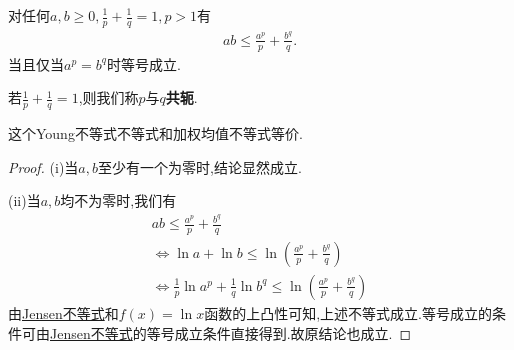 \documentclass[../../main.tex]{subfiles}%
\begin{document}
\begin{theorem}[Young不等式]\label{theorem:Young不等式}
对任何$a,b\geqslant 0,\frac{1}{p}+\frac{1}{q}=1,p>1$有
\begin{align*}
ab\leqslant \frac{a^p}{p}+\frac{b^q}{q}.
\end{align*}
当且仅当$a^p=b^q$时等号成立.
\end{theorem}
\begin{note}
若$\frac{1}{p}+\frac{1}{q}=1$,则我们称$p$与$q$\textbf{共轭}.\label{实数之间的共轭}
\end{note}
\begin{remark}
这个Young不等式不等式和加权均值不等式等价.
\end{remark}
\begin{proof}
(i)当$a,b$至少有一个为零时,结论显然成立.

(ii)当$a,b$均不为零时,我们有
\begin{gather*}
ab\leqslant \frac{a^p}{p}+\frac{b^q}{q}
\\
\Leftrightarrow \ln a+\ln b\leqslant \ln \left( \frac{a^p}{p}+\frac{b^q}{q} \right) 
\\
\Leftrightarrow \frac{1}{p}\ln a^p+\frac{1}{q}\ln b^q\leqslant \ln \left( \frac{a^p}{p}+\frac{b^q}{q} \right) 
\end{gather*}
由\hyperref[theorem:Jensen不等式]{Jensen不等式}和$f\left( x \right) =\ln x$函数的上凸性可知,上述不等式成立.等号成立的条件可由\hyperref[theorem:Jensen不等式]{Jensen不等式}的等号成立条件直接得到.故原结论也成立.   
\end{proof}
\end{document}

